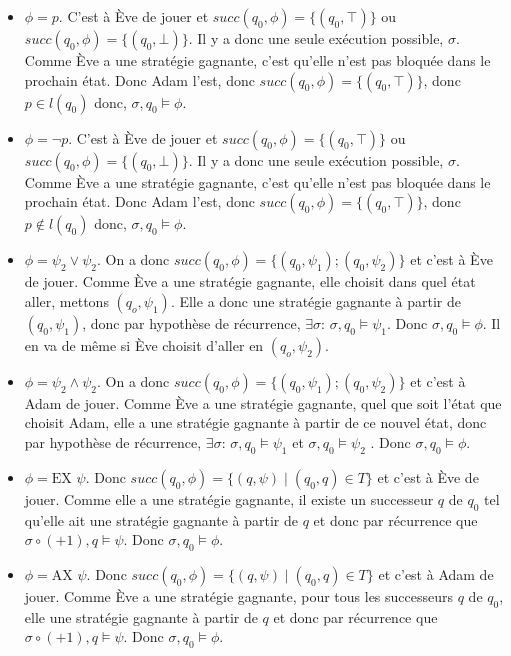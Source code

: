 \documentclass[10pt,a4paper]{article}
\begin{document}
\begin{itemize}
\item $\phi = p$. C'est à Ève de jouer et $succ(q_0,\phi) = \{(q_0, \top)\}$ ou $succ(q_0,\phi) = \{(q_0, \bot)\}$. Il y a donc une seule exécution possible, $\sigma$. Comme Ève a une stratégie gagnante, c'est qu'elle n'est pas bloquée dans le prochain état. Donc Adam l'est, donc $succ(q_0,\phi) = \{(q_0, \top)\}$, donc $p \in l(q_0)$ donc, $\sigma,q_0 \vDash \phi$.

\item $\phi = \neg p$. C'est à Ève de jouer et $succ(q_0,\phi) = \{(q_0, \top)\}$ ou $succ(q_0,\phi) = \{(q_0, \bot)\}$. Il y a donc une seule exécution possible, $\sigma$. Comme Ève a une stratégie gagnante, c'est qu'elle n'est pas bloquée dans le prochain état. Donc Adam l'est, donc $succ(q_0,\phi) = \{(q_0, \top)\}$, donc $p \notin l(q_0)$ donc, $\sigma,q_0 \vDash \phi$.

\item $\phi = \psi_2 \lor \psi_2$. On a donc $succ(q_0,\phi) = \{(q_0, \psi_1); (q_0, \psi_2) \}$ et c'est à Ève de jouer. Comme Ève a une stratégie gagnante, elle choisit dans quel état aller, mettons $(q_o, \psi_1)$. Elle a donc une stratégie gagnante à partir de $(q_0, \psi_1)$, donc par hypothèse de récurrence, $\exists \sigma$: $\sigma,q_0 \vDash \psi_1$. Donc $\sigma,q_0 \vDash \phi$. Il en va de même si Ève choisit d'aller en $(q_o, \psi_2)$.

\item $\phi = \psi_2 \land \psi_2$. On a donc $succ(q_0,\phi) = \{(q_0, \psi_1); (q_0, \psi_2) \}$ et c'est à Adam de jouer. Comme Ève a une stratégie gagnante, quel que soit l'état que choisit Adam, elle a une stratégie gagnante à partir de ce nouvel état, donc par hypothèse de récurrence, $\exists \sigma$: $\sigma,q_0 \vDash \psi_1$ et $\sigma,q_0 \vDash \psi_2$ . Donc $\sigma,q_0 \vDash \phi$.

\item $\phi = \mbox{EX } \psi$. Donc $succ(q_0, \phi) = \{ (q, \psi) \mid (q_0,q) \in T \} $ et c'est à Ève de jouer. Comme elle a une stratégie gagnante, il existe un successeur $q$ de $q_0$ tel qu'elle ait une stratégie gagnante à partir de $q$ et donc par récurrence que $\sigma \circ (+ 1), q \vDash \psi$. Donc $\sigma, q_0 \vDash \phi$.

\item $\phi = \mbox{AX } \psi$. Donc $succ(q_0, \phi) = \{ (q, \psi) \mid (q_0,q) \in T \} $ et c'est à Adam de jouer. Comme Ève a une stratégie gagnante, pour tous les successeurs $q$ de $q_0$, elle une stratégie gagnante à partir de $q$ et donc par récurrence que $\sigma \circ (+ 1), q \vDash \psi$. Donc $\sigma, q_0 \vDash \phi$.


\end{itemize}
\end{document}

